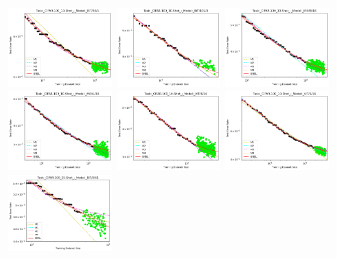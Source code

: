 \documentclass{article} %
\begin{document}
\begin{figure}
\includegraphics[width=0.245\textwidth]{figures/scaling_laws_benchmark_dataset_plots__all_functional_forms/c100_10___BiT_50_1.png}
\includegraphics[width=0.245\textwidth]{figures/scaling_laws_benchmark_dataset_plots__all_functional_forms/c100_10___BiT_101_3.png}
\includegraphics[width=0.245\textwidth]{figures/scaling_laws_benchmark_dataset_plots__all_functional_forms/c100_10___MiX_B_16.png}
\includegraphics[width=0.245\textwidth]{figures/scaling_laws_benchmark_dataset_plots__all_functional_forms/c100_10___MiX_L_16.png}
\includegraphics[width=0.245\textwidth]{figures/scaling_laws_benchmark_dataset_plots__all_functional_forms/c100_10___ViT_B_16.png}
\includegraphics[width=0.245\textwidth]{figures/scaling_laws_benchmark_dataset_plots__all_functional_forms/c100_10___ViT_S_16.png}
\includegraphics[width=0.245\textwidth]{figures/scaling_laws_benchmark_dataset_plots__all_functional_forms/c100_25___BiT_50_1.png}

\end{figure}
\end{document}
